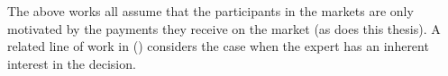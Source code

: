 The above works all assume that the participants in the markets are only motivated by the payments they receive on the market (as does this thesis). A related line of work in (\cite{boutilier2012eliciting}) considers the case when the expert has an inherent interest in the decision. 



